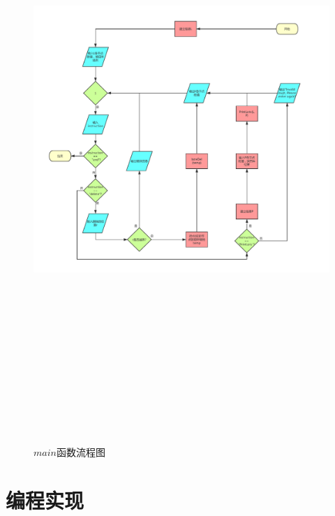 \documentclass[UTF8]{ctexart}
\begin{document}
\begin{figure}[H]
	\centering 
	\includegraphics[width=20cm, height=23cm]{list_ADT_main.pdf} 
	\caption{$main$函数流程图} 
	\label{main}
\end{figure}
\newpage



	\section{编程实现}
\end{document}
